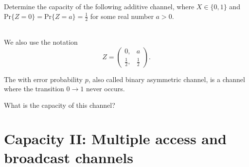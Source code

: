 \documentclass[a4paper, 11pt, openany]{book}
\begin{document}
    \begin{exercise}
    Determine the capacity of the following additive channel, where $X \in \{0,1\}$ and $\mathrm{Pr}\{Z = 0\} = \mathrm{Pr}\{Z = a\} = \frac{1}{2}$ for some real number $a > 0$.\\
    ~\\
    \begin{center}
    \end{center}
    \end{exercise}

    \begin{remark}
    We also use the notation
    $$
        Z = \begin{pmatrix}
            0, & a\\
            \frac{1}{2}, & \frac{1}{2}
        \end{pmatrix}.
    $$
    \end{remark}



    \begin{exercise}
    The  with error probability $p$, also called binary asymmetric channel, is a channel where the transition $0 \to 1$ never occurs.

    \begin{center}
    \end{center}

    What is the capacity of this channel?
    \end{exercise}


\section{Capacity II: Multiple access and broadcast channels}
\label{sec:34}
\end{document}
